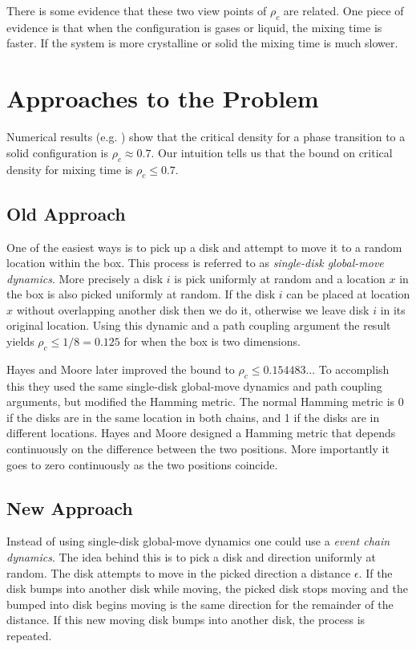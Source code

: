 \documentclass[a4paper,11pt]{article}
\begin{document}
There is some evidence that these two view points of $\rho_c$ are related.  One piece of evidence is that when the configuration is gases or liquid, the mixing time is faster.  If the system is more crystalline or solid the mixing time is much slower.

\section*{Approaches to the Problem}

Numerical results (e.g. \cite{Mak}\cite{Piasecki}) show that the critical density for a phase transition to a solid configuration is $\rho_c \approx 0.7$. Our intuition tells us that the bound on critical density for mixing time is $\rho_c \le 0.7$. 

\subsection*{Old Approach}

One of the easiest ways is to pick up a disk and attempt to move it to a random location within the box.  This process is referred to as \textit{single-disk global-move dynamics}.  More precisely a disk $i$ is pick uniformly at random and a location $x$ in the box is also picked uniformly at random.  If the disk $i$ can be placed at location $x$ without overlapping another disk then we do it, otherwise we leave disk $i$ in its original location.  Using this dynamic and a path coupling argument the result yields $\rho_c \le 1/8 = 0.125$ \cite{Kannan} for when the box is two dimensions.

Hayes and Moore \cite{Hayes} later improved the bound to $\rho_c \le 0.154483..$.  To accomplish this they used the same single-disk global-move dynamics and path coupling arguments, but modified the Hamming metric.  The normal Hamming metric is 0 if the disks are in the same location in both chains, and 1 if the disks are in different locations.  Hayes and Moore designed a Hamming metric that depends continuously on the difference between the two positions.  More importantly it goes to zero continuously as the two positions coincide.

\subsection*{New Approach}

Instead of using single-disk global-move dynamics one could use a \textit{event chain dynamics}.  The idea behind this is to pick a disk and direction uniformly at random.  The disk attempts to move in the picked direction a distance $\epsilon$.  If the disk bumps into another disk while moving, the picked disk stops moving and the bumped into disk begins moving is the same direction for the remainder of the distance.  If this new moving disk bumps into another disk, the process is repeated.
\end{document}
